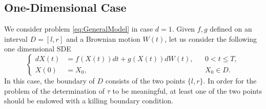 \subsection{One-Dimensional Case}
We consider problem \eqref{eq:GeneralModel} in case $d = 1$. Given $f,g$ defined on an interval $D = \left[l,r\right]$ and a Brownian motion $W(t)$, let us consider the following one dimensional SDE
\begin{equation}\label{eq:OneDModel}
\left \{
\begin{aligned}
	dX(t) &= f(X(t)) dt + g(X(t))dW(t), && 0 < t \leq T, \\
	X(0)  &= X_0, && X_0 \in D.
\end{aligned} \right .
\end{equation}
In this case, the boundary of $D$ consists of the two points $\{l,r\}$. In order for the problem of the determination of $\tau$ to be meaningful, at least one of the two points should be endowed with a killing boundary condition. 





